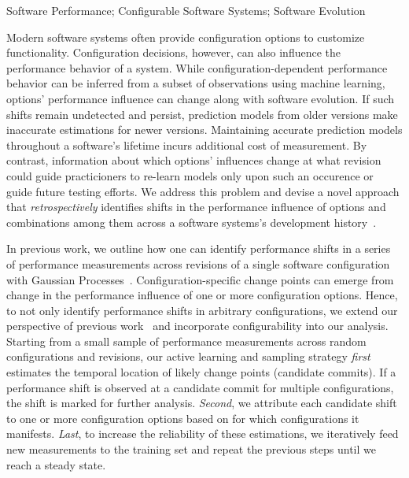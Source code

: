 \documentclass[utf8,biblatex]{lni}
\begin{document}
\begin{keywords}
Software Performance; Configurable Software Systems; Software Evolution
\end{keywords}

Modern software systems often provide configuration options to customize functionality. Configuration decisions, however, can also influence the performance behavior of a system. While configuration-dependent performance behavior can be inferred from a subset of observations using machine learning, options' performance influence can change along with software evolution. If such shifts remain undetected and persist, prediction models from older versions make inaccurate estimations for newer versions. Maintaining accurate prediction models throughout a software's lifetime incurs additional cost of measurement. By contrast, information about which options' influences change at what revision could guide practicioners to re-learn models only upon such an occurence or guide future testing efforts. 
We address this problem and devise a novel approach that \textit{retrospectively} identifies shifts in the performance influence of options and combinations among them across a software systems’s development history~\cite{muehlbauer_identifying_2020}. 

In previous work, we outline how one can identify performance shifts in a series of performance measurements across revisions of a single software configuration with Gaussian Processes~\cite{muhlbauer_accurate_2019}. Configuration-specific change points can emerge from change in the performance influence of one or more configuration options. Hence, to not only identify performance shifts in arbitrary configurations, we extend our perspective of previous work~\cite{muhlbauer_accurate_2019} and incorporate  configurability into our analysis. 
Starting from a small sample of performance measurements across random configurations and revisions, our active learning and sampling strategy \textit{first} estimates the temporal location of likely change points (candidate commits). If a performance shift is observed at a candidate commit for multiple configurations, the shift is marked for further analysis. \textit{Second}, we attribute each candidate shift to one or more configuration options based on for which configurations it manifests. \textit{Last}, to increase the reliability of these estimations, we iteratively feed new measurements to the training set and repeat the previous steps until we reach a steady state.
	
\end{document}
